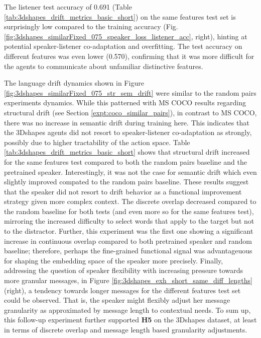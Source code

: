 The listener test accuracy of 0.691 (Table \ref{tab:3dshapes_drift_metrics_basic_short}) on the same features test set is surprisingly low compared to the training accuracy (Fig. \ref{fig:3dshapes_similarFixed_075_speaker_loss_listener_acc}, right), hinting at potential speaker-listener co-adaptation and overfitting. The test accuracy on different features was even lower (0.570), confirming that it was more difficult for the agents to communicate about unfamiliar distinctive features. 

The language drift dynamics shown in Figure \ref{fig:3dshapes_similarFixed_075_str_sem_drift} were similar to the random pairs experiments dynamics. While this patterned with MS COCO results regarding structural drift (see Section \ref{expt:coco_similar_pairs}), in contrast to MS COCO, there was no increase in semantic drift during training here. This indicates that the 3Dshapes agents did not resort to speaker-listener co-adaptation as strongly, possibly due to higher tractability of the action space.
Table \ref{tab:3dshapes_drift_metrics_basic_short} shows that structural drift increased for the same features test compared to both the random pairs baseline and the pretrained speaker. Interestingly, it was not the case for semantic drift which even slightly improved compated to the random pairs baseline. These results suggest that the speaker did not resort to drift behavior as a functional improvement strategy given more complex context. The discrete overlap decreased compared to the random baseline for both tests (and even more so for the same features test), mirroring the increased difficulty to select words that apply to the target but not to the distractor. Further, this experiment was the first one showing a significant increase in continuous overlap compared to both pretrained speaker and random baseline; therefore, perhaps the fine-grained functional signal was advantageuous for shaping the embedding space of the speaker more precisely. Finally, addressing the question of speaker flexibility with increasing pressure towards more granular messages, in Figure \ref{fig:3dshapes_exh_short_same_diff_lengths} (right), a tendency towards longer messages for the different features test set could be observed. That is, the speaker might flexibly adjust her message granularity as approximated by message length to contextual needs. %
To sum up, this follow-up experiment further supported \textbf{H5} on the 3Dshapes dataset, at least in terms of discrete overlap and message length based granularity adjustments.

